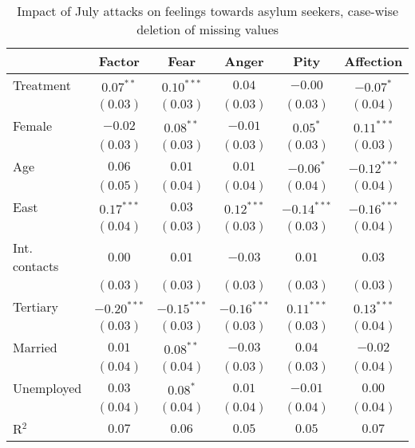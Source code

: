 
\begin{table}
\caption{Impact of July attacks on feelings towards asylum seekers, case-wise deletion of missing values}
\begin{center}
\begin{tabular}{l c c c c c}
\toprule
 & Factor & Fear & Anger & Pity & Affection \\
\midrule
Treatment     & $0.07^{**}$   & $0.10^{***}$  & $0.04$        & $-0.00$       & $-0.07^{*}$   \\
              & $(0.03)$      & $(0.03)$      & $(0.03)$      & $(0.03)$      & $(0.04)$      \\
Female        & $-0.02$       & $0.08^{**}$   & $-0.01$       & $0.05^{*}$    & $0.11^{***}$  \\
              & $(0.03)$      & $(0.03)$      & $(0.03)$      & $(0.03)$      & $(0.03)$      \\
Age           & $0.06$        & $0.01$        & $0.01$        & $-0.06^{*}$   & $-0.12^{***}$ \\
              & $(0.05)$      & $(0.04)$      & $(0.04)$      & $(0.04)$      & $(0.04)$      \\
East          & $0.17^{***}$  & $0.03$        & $0.12^{***}$  & $-0.14^{***}$ & $-0.16^{***}$ \\
              & $(0.04)$      & $(0.03)$      & $(0.03)$      & $(0.03)$      & $(0.04)$      \\
Int. contacts & $0.00$        & $0.01$        & $-0.03$       & $0.01$        & $0.03$        \\
              & $(0.03)$      & $(0.03)$      & $(0.03)$      & $(0.03)$      & $(0.03)$      \\
Tertiary      & $-0.20^{***}$ & $-0.15^{***}$ & $-0.16^{***}$ & $0.11^{***}$  & $0.13^{***}$  \\
              & $(0.03)$      & $(0.03)$      & $(0.03)$      & $(0.03)$      & $(0.04)$      \\
Married       & $0.01$        & $0.08^{**}$   & $-0.03$       & $0.04$        & $-0.02$       \\
              & $(0.04)$      & $(0.04)$      & $(0.03)$      & $(0.03)$      & $(0.04)$      \\
Unemployed    & $0.03$        & $0.08^{*}$    & $0.01$        & $-0.01$       & $0.00$        \\
              & $(0.04)$      & $(0.04)$      & $(0.04)$      & $(0.04)$      & $(0.04)$      \\
\midrule
R$^2$         & $0.07$        & $0.06$        & $0.05$        & $0.05$        & $0.07$        \\

\end{tabular}
\end{center}
\end{table}
